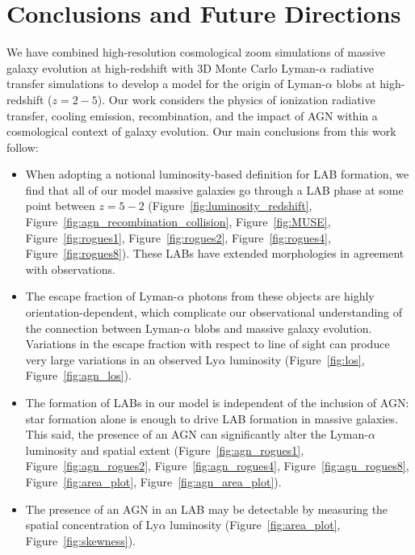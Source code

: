 \chapter{Conclusions and Future Directions}
\label{sec:discussion}
\label{sec:conclusions}

We have combined high-resolution cosmological zoom simulations of massive galaxy evolution at high-redshift with $3$D Monte Carlo Lyman-$\alpha$ radiative transfer simulations to develop a model for the origin of Lyman-$\alpha$ blobs at high-redshift ($z=2-5$).
Our work considers the physics of ionization radiative transfer, cooling emission, recombination, and the impact of AGN within a cosmological context of galaxy evolution.
Our main conclusions from this work follow:
\begin{itemize}

    \item When adopting a notional luminosity-based definition for LAB formation, we find that all of our model massive galaxies go through a LAB phase at some point between $z=5-2$ (Figure~\ref{fig:luminosity_redshift}, Figure~\ref{fig:agn_recombination_collision}, Figure~\ref{fig:MUSE}, Figure~\ref{fig:rogues1}, Figure~\ref{fig:rogues2}, Figure~\ref{fig:rogues4}, Figure~\ref{fig:rogues8}).  These LABs have extended morphologies in agreement with observations.

    \item The escape fraction of Lyman-$\alpha$ photons from these objects are highly orientation-dependent, which complicate our observational understanding of the connection between Lyman-$\alpha$ blobs and massive galaxy evolution. Variations in the escape fraction with respect to line of sight can produce very large variations in an observed Ly$\alpha$ luminosity (Figure~\ref{fig:los}, Figure~\ref{fig:agn_los}).
    
    \item The formation of LABs in our model is independent of the inclusion of AGN: star formation alone is enough to drive LAB formation in massive galaxies. This said, the presence of an AGN can significantly alter the Lyman-$\alpha$ luminosity and spatial extent (Figure~\ref{fig:agn_rogues1}, Figure~\ref{fig:agn_rogues2}, Figure~\ref{fig:agn_rogues4}, Figure~\ref{fig:agn_rogues8}, Figure~\ref{fig:area_plot}, Figure~\ref{fig:agn_area_plot}).
    
    \item The presence of an AGN in an LAB may be detectable by measuring the spatial concentration of Ly$\alpha$ luminosity (Figure~\ref{fig:area_plot}, Figure~\ref{fig:skewness}).
    

\end{itemize}
